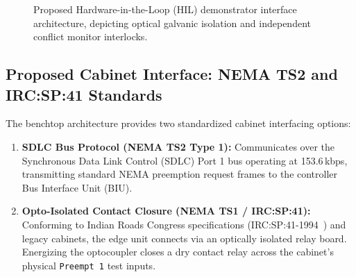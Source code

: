 \documentclass[journal,10pt,twocolumn]{IEEEtran}
\begin{document}
\begin{figure}[!t]
\centering
{}
\caption{Proposed Hardware-in-the-Loop (HIL) demonstrator interface architecture, depicting optical galvanic isolation and independent conflict monitor interlocks.}
\label{fig:hardware_wiring}
\end{figure}

\subsection{Proposed Cabinet Interface: NEMA TS2 and IRC:SP:41 Standards}
The benchtop architecture provides two standardized cabinet interfacing options:
\begin{enumerate}
    \item \textbf{SDLC Bus Protocol (NEMA TS2 Type 1):} Communicates over the Synchronous Data Link Control (SDLC) Port 1 bus operating at 153.6\,kbps, transmitting standard NEMA preemption request frames to the controller Bus Interface Unit (BIU).
    \item \textbf{Opto-Isolated Contact Closure (NEMA TS1 / IRC:SP:41):} Conforming to Indian Roads Congress specifications (IRC:SP:41-1994~\cite{irc1994}) and legacy cabinets, the edge unit connects via an optically isolated relay board. Energizing the optocoupler closes a dry contact relay across the cabinet's physical \texttt{Preempt 1} test inputs.
\end{enumerate}
\end{document}
